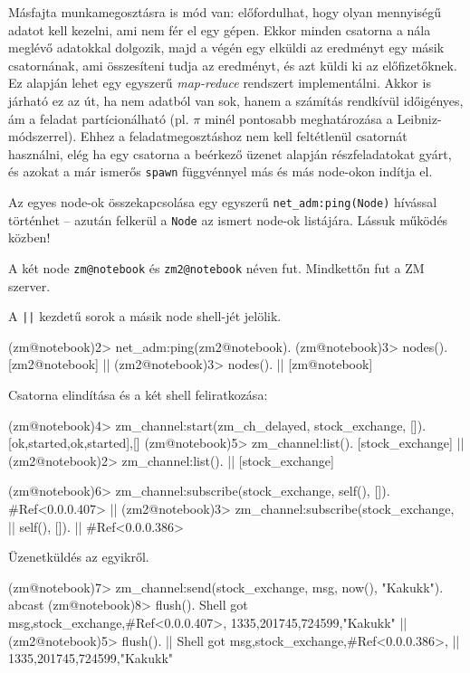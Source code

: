 \documentclass[12pt, a4paper, oneside]{book}
\begin{document}
Másfajta munkamegosztásra is mód van: előfordulhat, hogy olyan mennyiségű
adatot kell kezelni, ami nem fér el egy gépen. Ekkor minden csatorna a nála
meglévő adatokkal dolgozik, majd a végén egy elküldi az eredményt egy másik
csatornának, ami összesíteni tudja az eredményt, és azt küldi ki az
előfizetőknek. Ez alapján lehet egy egyszerű \emph{map-reduce} rendszert
implementálni. Akkor is járható ez az út, ha nem adatból van sok, hanem a
számítás rendkívül időigényes, ám a feladat partícionálható (pl. $\pi$ minél
pontosabb meghatározása a Leibniz-módszerrel). Ehhez a feladatmegosztáshoz nem
kell feltétlenül csatornát használni, elég ha egy csatorna a beérkező üzenet
alapján részfeladatokat gyárt, és azokat a már ismerős \texttt{spawn}
függvénnyel más és más node-okon indítja el.

Az egyes node-ok összekapcsolása egy egyszerű \texttt{net\_adm:ping(Node)}
hívással történhet -- azután felkerül a \texttt{Node} az ismert node-ok
listájára. Lássuk működés közben! 

A két node \texttt{zm@notebook} és \texttt{zm2@notebook} néven fut. Mindkettőn
fut a ZM szerver.

A \texttt{||} kezdetű sorok a másik node shell-jét jelölik.

\begin{code}{}{}
(zm@notebook)2> net_adm:ping(zm2@notebook).
(zm@notebook)3> nodes().
[zm2@notebook]
  || (zm2@notebook)3> nodes().
  || [zm@notebook]
\end{code}

Csatorna elindítása és a két shell feliratkozása:

\begin{code}{}{}
(zm@notebook)4> zm_channel:start(zm_ch_delayed, 
                                 stock_exchange, []).
{[{ok,started},{ok,started}],[]}
(zm@notebook)5> zm_channel:list().
[stock_exchange]
  || (zm2@notebook)2> zm_channel:list().
  || [stock_exchange]

(zm@notebook)6> zm_channel:subscribe(stock_exchange, 
                                     self(), []).   
#Ref<0.0.0.407>
  || (zm2@notebook)3> zm_channel:subscribe(stock_exchange, 
  ||                                       self(), []).
  || #Ref<0.0.0.386>
\end{code}

Üzenetküldés az egyikről.

\begin{code}{}{}
(zm@notebook)7> zm_channel:send(stock_exchange, 
                                {msg, {now(), "Kakukk"}}).
abcast
(zm@notebook)8> flush().
Shell got {msg,{stock_exchange,#Ref<0.0.0.407>},
               {{1335,201745,724599},"Kakukk"}}
  || (zm2@notebook)5> flush().
  || Shell got {msg,{stock_exchange,#Ref<0.0.0.386>},
  ||                {{1335,201745,724599},"Kakukk"}}
\end{code}
\end{document}
